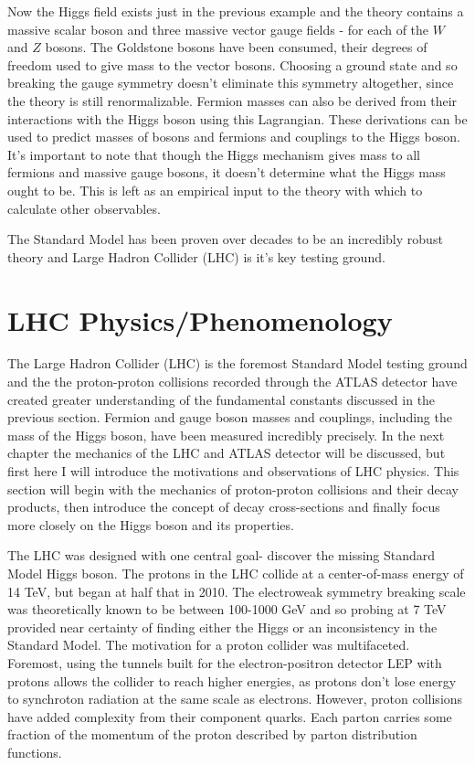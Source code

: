 Now the Higgs field exists just in the previous example and the theory contains a massive scalar boson and three massive vector gauge fields - for each of the $W$ and $Z$ bosons. The Goldstone bosons have been consumed, their degrees of freedom used to give mass to the vector bosons. Choosing a ground state and so breaking the gauge symmetry doesn't eliminate this symmetry altogether, since the theory is still renormalizable. Fermion masses can also be derived from their interactions with the Higgs boson using this Lagrangian. These derivations can be used to predict masses of bosons and fermions and couplings to the Higgs boson. It's important to note that though the Higgs mechanism gives mass to all fermions and massive gauge bosons, it doesn't determine what the Higgs mass ought to be. This is left as an empirical input to the theory with which to calculate other observables. 

The Standard Model has been proven over decades to be an incredibly robust theory and Large Hadron Collider (LHC) is it's key testing ground. 

\section{LHC Physics/Phenomenology}
The Large Hadron Collider (LHC) is the foremost Standard Model testing ground and the the proton-proton collisions recorded through the ATLAS detector have created greater understanding of the fundamental constants discussed in the previous section. Fermion and gauge boson masses and couplings, including the mass of the Higgs boson, have been measured incredibly precisely. In the next chapter the mechanics of the LHC and ATLAS detector will be discussed, but first here I will introduce the motivations and observations of LHC physics. This section will begin with the mechanics of proton-proton collisions and their decay products, then introduce the concept of decay cross-sections and finally focus more closely on the Higgs boson and its properties.

The LHC was designed with one central goal- discover the missing Standard Model Higgs boson. The protons in the LHC collide at a center-of-mass energy of 14 TeV, but began at half that in 2010. The electroweak symmetry breaking scale was theoretically known to be between 100-1000 GeV and so probing at 7 TeV provided near certainty of finding either the Higgs or an inconsistency in the Standard Model. The motivation for a proton collider was multifaceted. Foremost, using the tunnels built for the electron-positron detector LEP with protons allows the collider to reach higher energies, as protons don't lose energy to synchroton radiation at the same scale as electrons. However, proton collisions have added complexity from their component quarks. Each parton carries some fraction of the momentum of the proton described by parton distribution functions. 

